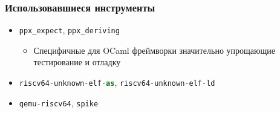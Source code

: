 \documentclass{beamer}
\begin{document}
\begin{frame}
	\frametitle{Использовавшиеся инструменты}
		\begin{itemize}
			\item \lstinline[language=Python]|ppx_expect|,  \lstinline[language=Python]|ppx_deriving|
			\begin{itemize}
				\item Специфичные для OCaml фреймворки значительно упрощающие тестирование и отладку
			\end{itemize}
			
			\item \lstinline[language=Python]|riscv64-unknown-elf-as|,  \lstinline[language=Python]|riscv64-unknown-elf-ld|
			\item \lstinline[language=Python]|qemu-riscv64|, \lstinline[language=Python]|spike|
		\end{itemize}
\end{frame}
\end{document}
